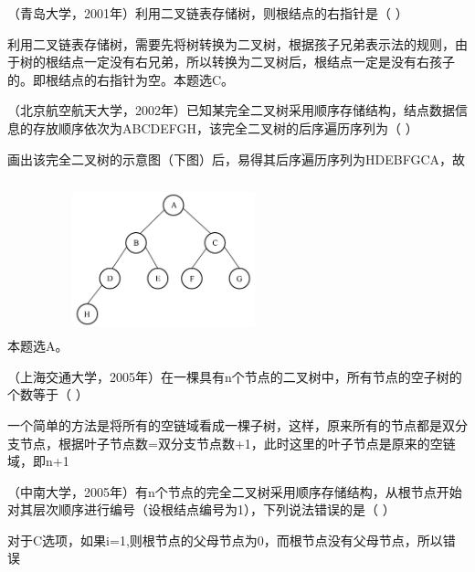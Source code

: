 \question （青岛大学，2001年）利用二叉链表存储树，则根结点的右指针是（ ）
\par{}
\begin{solution}利用二叉链表存储树，需要先将树转换为二叉树，根据孩子兄弟表示法的规则，由于树的根结点一定没有右兄弟，所以转换为二叉树后，根结点一定是没有右孩子的。即根结点的右指针为空。本题选C。
\end{solution}
\question （北京航空航天大学，2002年）已知某完全二叉树采用顺序存储结构，结点数据信息的存放顺序依次为ABCDEFGH，该完全二叉树的后序遍历序列为（
）
\par{}
\begin{solution}画出该完全二叉树的示意图（下图）后，易得其后序遍历序列为HDEBFGCA，故本题选A。
\includegraphics[width=2.08333in,height=2.08333in]{computerassets/82999f59b924ff27710fe8094367a64b.jpeg}
\end{solution}
\question （上海交通大学，2005年）在一棵具有n个节点的二叉树中，所有节点的空子树的个数等于（
）
\par{}
\begin{solution}一个简单的方法是将所有的空链域看成一棵子树，这样，原来所有的节点都是双分支节点，根据叶子节点数=双分支节点数+1，此时这里的叶子节点是原来的空链域，即n+1
\end{solution}
\question （中南大学，2005年）有n个节点的完全二叉树采用顺序存储结构，从根节点开始对其层次顺序进行编号（设根结点编号为1），下列说法错误的是（
）
\par{}
\begin{solution}对于C选项，如果i=1,则根节点的父母节点为0，而根节点没有父母节点，所以错误
\end{solution}
